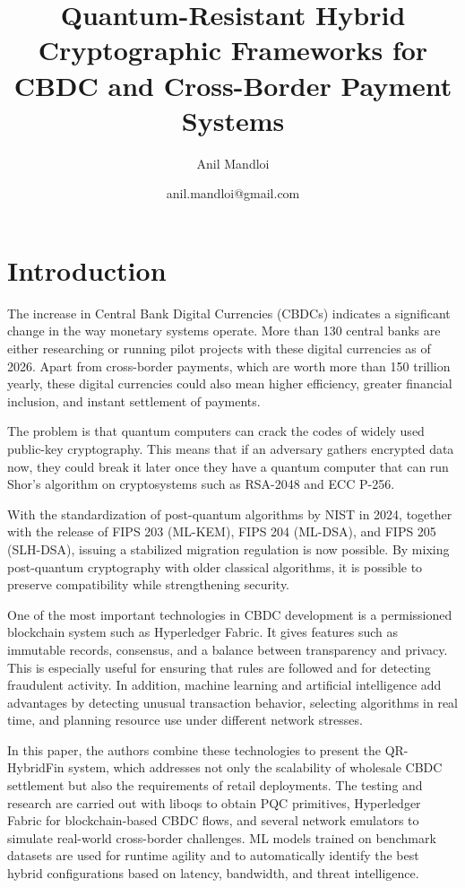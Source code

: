 \documentclass[pdflatex,sn-basic,english]{sn-jnl}
\title{Quantum-Resistant Hybrid Cryptographic Frameworks for CBDC and Cross-Border Payment Systems}
\author[1]{Anil Mandloi}
\author[1]{anil.mandloi@gmail.com}
\affil[1]{Senior Engineer}
\begin{document}
\maketitle

\section{Introduction}

The increase in Central Bank Digital Currencies (CBDCs) indicates a significant change in the way monetary systems operate. More than 130 central banks are either researching or running pilot projects with these digital currencies as of 2026. Apart from cross-border payments, which are worth more than 150 trillion yearly, these digital currencies could also mean higher efficiency, greater financial inclusion, and instant settlement of payments.

The problem is that quantum computers can crack the codes of widely used public-key cryptography. This means that if an adversary gathers encrypted data now, they could break it later once they have a quantum computer that can run Shor's algorithm on cryptosystems such as RSA-2048 and ECC P-256.

With the standardization of post-quantum algorithms by NIST in 2024, together with the release of FIPS 203 (ML-KEM), FIPS 204 (ML-DSA), and FIPS 205 (SLH-DSA), issuing a stabilized migration regulation is now possible. By mixing post-quantum cryptography with older classical algorithms, it is possible to preserve compatibility while strengthening security.

One of the most important technologies in CBDC development is a permissioned blockchain system such as Hyperledger Fabric. It gives features such as immutable records, consensus, and a balance between transparency and privacy. This is especially useful for ensuring that rules are followed and for detecting fraudulent activity. In addition, machine learning and artificial intelligence add advantages by detecting unusual transaction behavior, selecting algorithms in real time, and planning resource use under different network stresses.

In this paper, the authors combine these technologies to present the QR-HybridFin system, which addresses not only the scalability of wholesale CBDC settlement but also the requirements of retail deployments. The testing and research are carried out with liboqs to obtain PQC primitives, Hyperledger Fabric for blockchain-based CBDC flows, and several network emulators to simulate real-world cross-border challenges. ML models trained on benchmark datasets are used for runtime agility and to automatically identify the best hybrid configurations based on latency, bandwidth, and threat intelligence.
\end{document}
